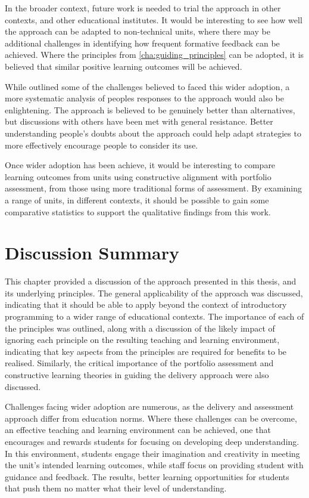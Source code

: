 In the broader context, future work is needed to trial the approach in other contexts, and other educational institutes. It would be interesting to see how well the approach can be adapted to non-technical units, where there may be additional challenges in identifying how frequent formative feedback can be achieved. Where the principles from \cref{cha:guiding_principles} can be adopted, it is believed that similar positive learning outcomes will be achieved.

While  outlined some of the challenges believed to faced this wider adoption, a more systematic analysis of peoples responses to the approach would also be enlightening. The approach is believed to be genuinely better than alternatives, but discussions with others have been met with general resistance. Better understanding people's doubts about the approach could help adapt strategies to more effectively encourage people to consider its use.

Once wider adoption has been achieve, it would be interesting to compare learning outcomes from units using constructive alignment with portfolio assessment, from those using more traditional forms of assessment. By examining a range of units, in different contexts, it should be possible to gain some comparative statistics to support the qualitative findings from this work.


\section{Discussion Summary} %
\label{sec:disc_summary}

This chapter provided a discussion of the approach presented in this thesis, and its underlying principles. The general applicability of the approach was discussed, indicating that it should be able to apply beyond the context of introductory programming to a wider range of educational contexts. The importance of each of the principles was outlined, along with a discussion of the likely impact of ignoring each principle on the resulting teaching and learning environment, indicating that key aspects from the principles are required for benefits to be realised. Similarly, the critical importance of the portfolio assessment and constructive learning theories in guiding the delivery approach were also discussed.

Challenges facing wider adoption are numerous, as the delivery and assessment approach differ from education norms. Where these challenges can be overcome, an effective teaching and learning environment can be achieved, one that encourages and rewards students for focusing on developing deep understanding. In this environment, students engage their imagination and creativity in meeting the unit's intended learning outcomes, while staff focus on providing student with guidance and feedback. The results, better learning opportunities for students that push them no matter what their level of understanding.

